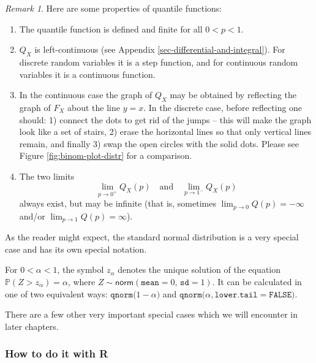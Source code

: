 \documentclass[]{book}
\providecommand{\tightlist}{%
  \setlength{\itemsep}{0pt}\setlength{\parskip}{0pt}}
\numberwithin{equation}{chapter}
\numberwithin{figure}{chapter}
\theoremstyle{plain}
\theoremstyle{definition}
\theoremstyle{remark}
\theoremstyle{definition}
\theoremstyle{definition}
\theoremstyle{remark}
\newtheorem*{remark}{Remark}
\let\BeginKnitrBlock\begin \let\EndKnitrBlock\end
\begin{document}
\begin{remark}
Here are some properties of quantile functions:

\begin{enumerate}
\def\labelenumi{\arabic{enumi}.}
\tightlist
\item
  The quantile function is defined and finite for all \(0<p<1\).
\item
  \(Q_{X}\) is left-continuous (see Appendix
  \ref{sec-differential-and-integral}). For discrete random variables it
  is a step function, and for continuous random variables it is a
  continuous function.
\item
  In the continuous case the graph of \(Q_{X}\) may be obtained by
  reflecting the graph of \(F_{X}\) about the line \(y=x\). In the
  discrete case, before reflecting one should: 1) connect the dots to
  get rid of the jumps -- this will make the graph look like a set of
  stairs, 2) erase the horizontal lines so that only vertical lines
  remain, and finally 3) swap the open circles with the solid dots.
  Please see Figure \ref{fig:binom-plot-distr} for a comparison.
\item
  The two limits \[ \lim_{p\to0^{+}}Q_{X}(p)\quad \mbox{and}\quad
     \lim_{p\to1^{-}}Q_{X}(p) \] always exist, but may be infinite (that
  is, sometimes \(\lim_{p\to0}Q(p)=-\infty\) and/or
  \(\lim_{p\to1}Q(p)=\infty\)).
\end{enumerate}
\end{remark}

As the reader might expect, the standard normal distribution is a very
special case and has its own special notation.

\bigskip

\BeginKnitrBlock{definition}
\protect\hypertarget{def:unnamed-chunk-274}{}{\label{def:unnamed-chunk-274}}For
\(0<\alpha<1\), the symbol \(z_{\alpha}\) denotes the unique solution of
the equation \(\mathbb{P} ( Z > z_{\alpha}) = \alpha\), where
\(Z \sim \mathsf{norm}(\mathtt{mean} = 0,\,\mathtt{sd} = 1)\). It can be
calculated in one of two equivalent ways:
\(\mathtt{qnorm(} 1 - \alpha \mathtt{)}\) and
\(\mathtt{qnorm(} \alpha \mathtt{, lower.tail = FALSE)}\).
\EndKnitrBlock{definition}

There are a few other very important special cases which we will
encounter in later chapters.

\subsubsection{How to do it with R}\label{how-to-do-it-with-r-25}
\end{document}
